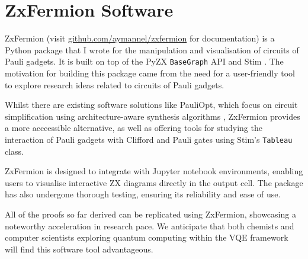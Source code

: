 \chapter{ZxFermion Software}%
\label{zxfermion}

ZxFermion (visit \href{https://github.com/aymannel/zxfermion}{github.com/aymannel/zxfermion} for documentation) is a Python package that I wrote for the manipulation and visualisation of circuits of Pauli gadgets. It is built on top of the PyZX \lstinline{BaseGraph} API \cite{Kissinger2020} and Stim \cite{Gidney2021}. The motivation for building this package came from the need for a user-friendly tool to explore research ideas related to circuits of Pauli gadgets.

Whilst there are existing software solutions like PauliOpt, which focus on circuit simplification using architecture-aware synthesis algorithms \cite{Gogioso2023}, ZxFermion provides a more acccessible alternative, as well as offering tools for studying the interaction of Pauli gadgets with Clifford and Pauli gates using Stim's \lstinline{Tableau} class.

ZxFermion is designed to integrate with Jupyter notebook environments, enabling users to visualise interactive ZX diagrams directly in the output cell. The package has also undergone thorough testing, ensuring its reliability and ease of use.

All of the proofs so far derived can be replicated using ZxFermion, showcasing a noteworthy acceleration in research pace. We anticipate that both chemists and computer scientists exploring quantum computing within the VQE framework will find this software tool advantageous.
